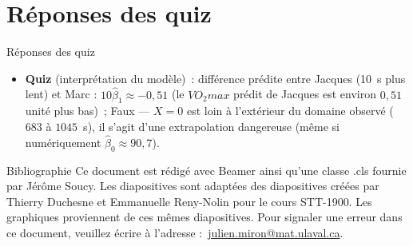 \documentclass{BeamerTemplate}
\begin{document}
\section{Réponses des quiz}

\begin{frame}[t]{Réponses des quiz}
\footnotesize
\begin{itemize}
\item \textbf{Quiz} (interprétation du modèle)~: différence prédite entre Jacques (10~s plus lent) et
Marc : $10\hat\beta_1\approx-0{,}51$ (le $VO_2max$ prédit de Jacques est environ $0{,}51$ unité plus bas)~;
Faux --- $X=0$ est loin à l'extérieur du domaine observé ($683$ à $1045$~s), il s'agit d'une extrapolation
dangereuse (même si numériquement $\hat\beta_0\approx90{,}7$).
\end{itemize}

\end{frame}

\begin{frame}{Bibliographie}
 	Ce document est rédigé avec Beamer ainsi qu'une classe .cls fournie par Jérôme Soucy. Les diapositives sont adaptées des diapositives créées par Thierry Duchesne et Emmanuelle Reny-Nolin pour le cours STT-1900. Les graphiques proviennent de ces mêmes diapositives.
 	\printbibliography
 	\vfill
 	\footnotesize Pour signaler une erreur dans ce document, veuillez écrire à l'adresse :~\href{mailto:julien.miron@mat.ulaval.ca}{julien.miron@mat.ulaval.ca}.
 \end{frame}
\end{document}
